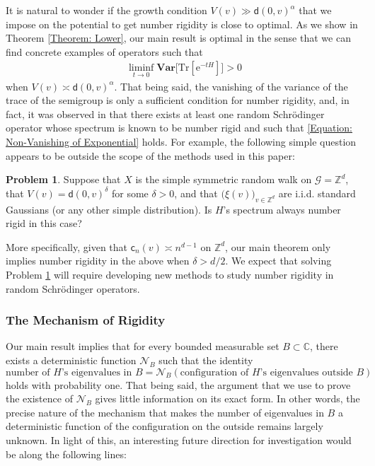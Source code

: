\documentclass{amsart}
\numberwithin{equation}{section}
\theoremstyle{definition}
\newtheorem{problem}[theorem]{Problem}
\newcommand\al{\alpha}
\newcommand\de{\delta}
\newcommand\mbb{\mathbb}
\newcommand\mbf{\mathbf}
\newcommand\mc{\mathcal}
\newcommand\mr{\mathrm}
\newcommand\ms{\mathscr}
\newcommand\msf{\mathsf}
\begin{document}
%

It is natural to wonder if the growth condition $V(v)\gg\msf d(0,v)^\al$
that we impose on the potential to get number rigidity is close to optimal. As we
show in Theorem \ref{Theorem: Lower}, our main result is optimal in the sense that
we can find concrete examples of operators such that
\begin{align}
\label{Equation: Non-Vanishing of Exponential}
\liminf_{t\to0}\mbf{Var}\big[\mr{Tr}[\mr e^{-t H}]\big]>0
\end{align}
when $V(v)\asymp\msf d(0,v)^\al$. That being said, the vanishing of the variance of the
trace of the semigroup is only a sufficient condition for number rigidity, and, in fact,
it was observed in \cite[Proposition 2.27]{GGL20} that there
exists at least one random Schr\"odinger operator whose spectrum is known to
be number rigid and such that \eqref{Equation: Non-Vanishing of Exponential}
holds. For example, the following simple question appears to be outside the scope
of the methods used in this paper:

%

\begin{problem}
\label{Problem: Rigidity vs. Dimension}
Suppose that $X$ is the simple symmetric random walk on $\ms G=\mbb Z^d$,
that $V(v)=\msf d(0,v)^\de$ for some $\de>0$, and that $\big(\xi(v)\big)_{v\in\mbb Z^d}$
are i.i.d. standard Gaussians (or any other simple distribution). Is $H$'s spectrum always number rigid in this case?
\end{problem}

%

More specifically, given that $\msf c_n(v)\asymp n^{d-1}$ on $\mbb Z^d$,
our main theorem only implies number rigidity in the above when $\de>d/2$.
We expect that solving Problem \ref{Problem: Rigidity vs. Dimension}
will require developing new methods to study number rigidity in random
Schr\"odinger operators.

%

\subsubsection{The Mechanism of Rigidity}
\label{Section: Mechanism}

%

Our main result implies that for every bounded measurable set $B\subset\mbb C$,
there exists a deterministic function $\mc N_B$ such that
the identity
\[\text{number of $H$'s eigenvalues in $B$}=\mc N_B(\text{configuration of $H$'s eigenvalues outside $B$})\]
holds with probability one. That being said, the argument that we use to prove the
existence of $\mc N_B$
gives little information on its exact form. In other words, the precise nature
of the mechanism that makes the number of eigenvalues in $B$ a deterministic function of the configuration
on the outside remains largely unknown. In light of this, an interesting future direction for investigation would be
along the following lines:
\end{document}
